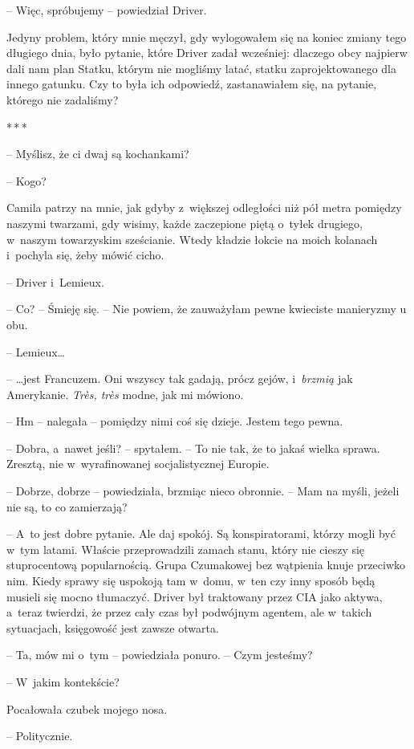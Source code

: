 \documentclass[oneside,polish,12pt,sfheadings]{mwbk}
\newcommand{\threeast}{\bigskip\par\centerline{*\,*\,*}\medskip\par}%
\begin{document}
-- Więc, spróbujemy -- powiedział Driver.

Jedyny problem, który mnie męczył, gdy wylogowałem się na koniec zmiany
tego długiego dnia, było pytanie, które Driver zadał wcześniej:
dlaczego obcy najpierw dali nam plan Statku, którym nie mogliśmy latać,
statku zaprojektowanego dla innego gatunku. Czy to była ich odpowiedź,
zastanawiałem się, na pytanie, którego nie zadaliśmy?

\threeast

-- Myślisz, że ci dwaj są kochankami?

-- Kogo?

Camila patrzy na mnie, jak gdyby z~większej odległości niż pół metra
pomiędzy naszymi twarzami, gdy wisimy, każde zaczepione piętą o~tyłek
drugiego, w~naszym towarzyskim sześcianie. Wtedy kładzie łokcie na moich
kolanach i~pochyla się, żeby mówić cicho.

-- Driver i~Lemieux.

-- Co? -- Śmieję się. -- Nie powiem, że zauważyłam pewne kwieciste
manieryzmy u obu.

-- Lemieux\ldots

-- \ldots jest Francuzem. Oni wszyscy tak gadają, prócz gejów, i~\emph{brzmią} jak Amerykanie. \emph{Très, très } modne, jak mi mówiono.

-- Hm -- nalegała -- pomiędzy nimi coś się dzieje. Jestem tego pewna.

-- Dobra, a~nawet jeśli? -- spytałem. -- To nie tak, że to jakaś wielka
sprawa. Zresztą, nie w~wyrafinowanej socjalistycznej Europie.

-- Dobrze, dobrze -- powiedziała, brzmiąc nieco obronnie. -- Mam na myśli,
jeżeli nie są, to co zamierzają?

-- A~to jest dobre pytanie. Ale daj spokój. Są konspiratorami, którzy
mogli być w~tym latami. Właście przeprowadzili zamach stanu, który nie
cieszy się stuprocentową popularnością. Grupa Czumakowej bez wątpienia
knuje przeciwko nim. Kiedy sprawy się uspokoją tam w~domu, w~ten czy
inny sposób będą musieli się mocno tłumaczyć. Driver był traktowany
przez CIA jako aktywa, a~teraz twierdzi, że przez cały czas był
podwójnym agentem, ale w~takich sytuacjach, księgowość jest zawsze
otwarta.

-- Ta, mów mi o~tym -- powiedziała ponuro. -- Czym jesteśmy?

-- W~jakim kontekście?

Pocałowała czubek mojego nosa. 

-- Politycznie.
\end{document}
